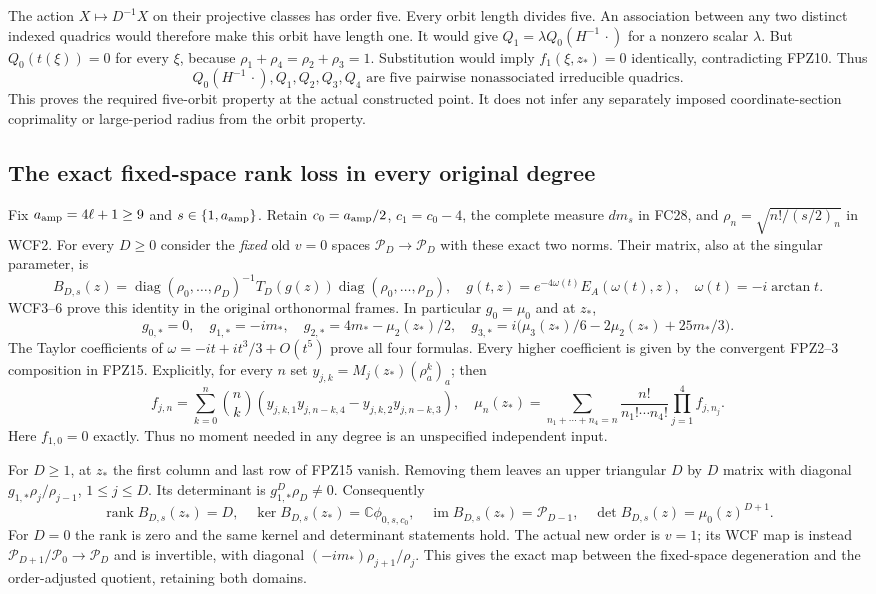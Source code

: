 The action $X\mapsto D^{-1}X$ on their projective classes has order
five. Every orbit length divides five. An association between any two
distinct indexed quadrics would therefore make this orbit have length
one. It would give $Q_1=\lambda Q_0(H^{-1}\,\cdot)$ for a nonzero
scalar $\lambda$. But $Q_0(t(\xi))=0$ for every $\xi$, because
$\rho_1+\rho_4=\rho_2+\rho_3=1$. Substitution would imply
$f_1(\xi,z_*)=0$ identically, contradicting FPZ10. Thus
\[
 Q_0(H^{-1}\,\cdot),Q_1,Q_2,Q_3,Q_4
 \text{ are five pairwise nonassociated irreducible quadrics.}
 \tag{FPZ14}
\]
This proves the required five-orbit property at the actual constructed
point. It does not infer any separately imposed coordinate-section
coprimality or large-period radius from the orbit property.

\subsection{The exact fixed-space rank loss in every original degree}
Fix $a_{\rm amp}=4\ell+1\ge9$ and $s\in\{1,a_{\rm amp}\}$.
Retain $c_0=a_{\rm amp}/2$, $c_1=c_0-4$, the complete measure
$dm_s$ in FC28, and $\rho_n=\sqrt{n!/(s/2)_n}$ in WCF2.
For every $D\ge0$ consider the \emph{fixed} old $v=0$ spaces
$\mathcal P_D\to\mathcal P_D$ with these exact two norms.
Their matrix, also at the singular parameter, is
\[
 B_{D,s}(z)=\operatorname{diag}(\rho_0,\ldots,\rho_D)^{-1}
 T_D(g(z))\operatorname{diag}(\rho_0,\ldots,\rho_D),\quad
 g(t,z)=e^{-4\omega(t)}E_A(\omega(t),z),\quad
 \omega(t)=-i\arctan t.
 \tag{FPZ15}
\]
WCF3--6 prove this identity in the original orthonormal frames.
In particular $g_0=\mu_0$ and at $z_*$,
\[
 g_{0,*}=0,\quad g_{1,*}=-im_*,\quad
 g_{2,*}=4m_*-\mu_2(z_*)/2,\quad
 g_{3,*}=i\bigl(\mu_3(z_*)/6-2\mu_2(z_*)+25m_*/3\bigr).
 \tag{FPZ16}
\]
The Taylor coefficients of $\omega=-it+it^3/3+O(t^5)$ prove all
four formulas. Every higher coefficient is given by the convergent
FPZ2--3 composition in FPZ15. Explicitly, for every $n$ set
$y_{j,k}=M_j(z_*)(\rho_a^k)_a$; then
\[
 f_{j,n}=\sum_{k=0}^n\binom nk
 (y_{j,k,1}y_{j,n-k,4}-y_{j,k,2}y_{j,n-k,3}),\quad
 \mu_n(z_*)=\sum_{n_1+\cdots+n_4=n}
 \frac{n!}{n_1!\cdots n_4!}\prod_{j=1}^4 f_{j,n_j}.
 \tag{FPZ17}
\]
Here $f_{1,0}=0$ exactly. Thus no moment needed in any degree is
an unspecified independent input.

For $D\ge1$, at $z_*$ the first column and last row of FPZ15
vanish. Removing them leaves an upper triangular $D$ by $D$ matrix
with diagonal $g_{1,*}\rho_j/\rho_{j-1}$, $1\le j\le D$.
Its determinant is $g_{1,*}^D\rho_D\ne0$. Consequently
\[
 \operatorname{rank}B_{D,s}(z_*)=D,\quad
 \ker B_{D,s}(z_*)=\mathbb C\phi_{0,s,c_0},\quad
 \operatorname{im}B_{D,s}(z_*)=\mathcal P_{D-1},\quad
 \det B_{D,s}(z)=\mu_0(z)^{D+1}.
 \tag{FPZ18}
\]
For $D=0$ the rank is zero and the same kernel and determinant
statements hold. The actual new order is $v=1$; its WCF map is instead
$\mathcal P_{D+1}/\mathcal P_0\to\mathcal P_D$ and is invertible,
with diagonal $(-im_*)\rho_{j+1}/\rho_j$. This gives the exact
map between the fixed-space degeneration and the order-adjusted
quotient, retaining both domains.

